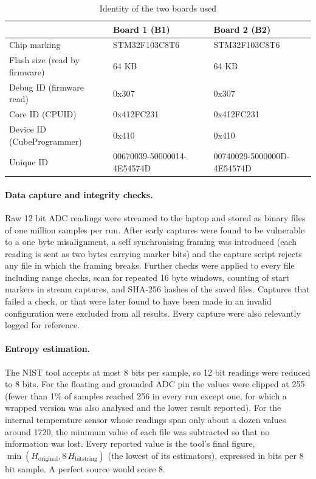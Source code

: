 \documentclass[a4paper, 12pt]{article}
\begin{document}
\begin{table}[htbp]
\centering
\small
\caption{Identity of the two boards used}

\label{tab:bp_ids}
\begin{tabularx}{\textwidth}{@{}p{}XX@{}}
\toprule
 & \textbf{Board 1 (B1)} & \textbf{Board 2 (B2)} \\
\midrule
Chip marking & STM32F103C8T6 & STM32F103C8T6 \\
Flash size (read by firmware) & 64 KB & 64 KB \\
Debug ID (firmware read) & 0x307 & 0x307 \\
Core ID (CPUID) & 0x412FC231 & 0x412FC231 \\
Device ID (CubeProgrammer) & 0x410 & 0x410 \\
Unique ID & 00670039-50000014-4E54574D & 00740029-5000000D-4E54574D \\
\bottomrule
\end{tabularx}
\end{table}
 
\paragraph{Data capture and integrity checks.} Raw 12 bit ADC readings were streamed to the laptop and stored as binary files of one million samples per run. After early captures were found to be vulnerable to a one byte misalignment, a self synchronising framing was introduced (each reading is sent as two bytes carrying marker bits) and the capture script rejects any file in which the framing breaks. Further checks were applied to every file including range checks, scan for repeated 16 byte windows, counting of start markers in stream captures, and SHA-256 hashes of the saved files. Captures that failed a check, or that were later found to have been made in an invalid configuration were excluded from all results. Every capture were also relevantly logged for reference.
 
\paragraph{Entropy estimation.} The NIST tool accepts at most 8 bits per sample, so 12 bit readings were reduced to 8 bits. For the floating and grounded ADC pin the values were clipped at 255 (fewer than 1\% of samples reached 256 in every run except one, for which a wrapped version was also analysed and the lower result reported). For the internal temperature sensor whose readings span only about a dozen values around 1720, the minimum value of each file was subtracted so that no information was lost. Every reported value is the tool's final figure, $\min(H_{\mathrm{original}}, 8\,H_{\mathrm{bitstring}})$ (the lowest of its estimators), expressed in bits per 8 bit sample. A perfect source would score 8.
 
\end{document}
